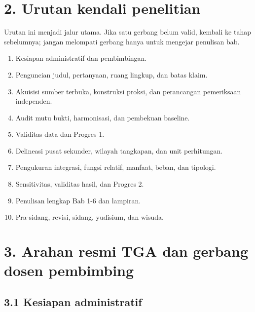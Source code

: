 \documentclass[
  indonesian,
  11pt,
]{article}
\providecommand{\tightlist}{%
  \setlength{\itemsep}{0pt}\setlength{\parskip}{0pt}}
\renewcommand{\tightlist}{%
  \setlength{\itemsep}{0.22em}%
  \setlength{\parskip}{0pt}%
}
\begin{document}
\section{2. Urutan kendali penelitian}\label{urutan-kendali-penelitian}

Urutan ini menjadi jalur utama. Jika satu gerbang belum valid, kembali
ke tahap sebelumnya; jangan melompati gerbang hanya untuk mengejar
penulisan bab.

\begin{enumerate}
\def\labelenumi{\arabic{enumi}.}
\tightlist
\item
  Kesiapan administratif dan pembimbingan.
\item
  Penguncian judul, pertanyaan, ruang lingkup, dan batas klaim.
\item
  Akuisisi sumber terbuka, konstruksi proksi, dan perancangan
  pemeriksaan independen.
\item
  Audit mutu bukti, harmonisasi, dan pembekuan baseline.
\item
  Validitas data dan Progres 1.
\item
  Delineasi pusat sekunder, wilayah tangkapan, dan unit perhitungan.
\item
  Pengukuran integrasi, fungsi relatif, manfaat, beban, dan tipologi.
\item
  Sensitivitas, validitas hasil, dan Progres 2.
\item
  Penulisan lengkap Bab 1-6 dan lampiran.
\item
  Pra-sidang, revisi, sidang, yudisium, dan wisuda.
\end{enumerate}

\section{3. Arahan resmi TGA dan gerbang dosen
pembimbing}\label{arahan-resmi-tga-dan-gerbang-dosen-pembimbing}

\subsection{3.1 Kesiapan administratif}\label{kesiapan-administratif}
\end{document}
